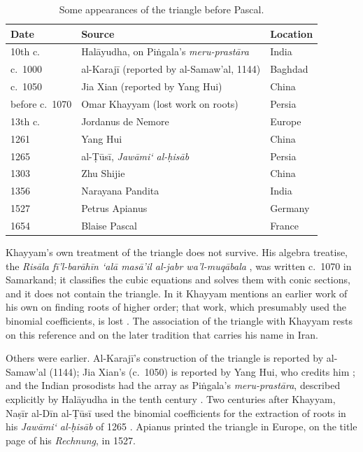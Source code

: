 \documentclass[11pt]{amsart}
\begin{document}
\begin{table}[h]
\centering
\caption{Some appearances of the triangle before Pascal.}
\label{tab:timeline}
\begin{tabular}{lll}
\hline
Date & Source & Location \\
\hline
10th c. & Halāyudha, on Piṅgala's \emph{meru-prastāra} & India \\
c.~1000 & al-Karajī (reported by al-Samaw'al, 1144) & Baghdad \\
c.~1050 & Jia Xian (reported by Yang Hui) & China \\
before c.~1070 & Omar Khayyam (lost work on roots) & Persia \\
13th c. & Jordanus de Nemore & Europe \\
1261 & Yang Hui \cite{yanghui1261} & China \\
1265 & al-\d{T}ūsī, \emph{Jawāmi` al-ḥisāb} \cite{altusi1265} & Persia \\
1303 & Zhu Shijie & China \\
1356 & Narayana Pandita & India \\
1527 & Petrus Apianus & Germany \\
1654 & Blaise Pascal \cite{pascal1654} & France \\
\hline
\end{tabular}
\end{table}

Khayyam's own treatment of the triangle does not survive. His algebra treatise, the \emph{Risāla fī'l-barāhīn `alā masā'il al-jabr wa'l-muqābala} \cite{khayyam1070,rashed2000}, was written c.~1070 in Samarkand; it classifies the cubic equations and solves them with conic sections, and it does not contain the triangle. In it Khayyam mentions an earlier work of his own on finding roots of higher order; that work, which presumably used the binomial coefficients, is lost \cite{rashed2000,edwards1987}. The association of the triangle with Khayyam rests on this reference and on the later tradition that carries his name in Iran.

Others were earlier. Al-Karajī's construction of the triangle is reported by al-Samaw'al (1144); Jia Xian's (c.~1050) is reported by Yang Hui, who credits him \cite{yanghui1261}; and the Indian prosodists had the array as Piṅgala's \emph{meru-prastāra}, described explicitly by Halāyudha in the tenth century \cite{edwards1987}. Two centuries after Khayyam, Naṣīr al-Dīn al-\d{T}ūsī used the binomial coefficients for the extraction of roots in his \emph{Jawāmi` al-ḥisāb} of 1265 \cite{altusi1265}. Apianus printed the triangle in Europe, on the title page of his \emph{Rechnung}, in 1527.
\end{document}
